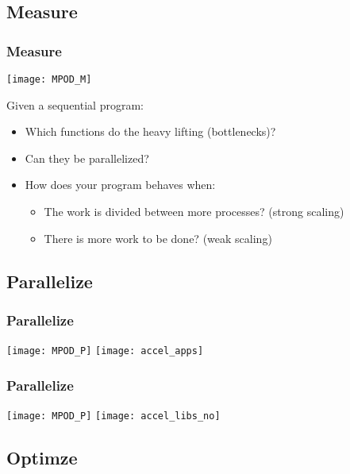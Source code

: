 \documentclass[10pt, compress]{beamer}
\begin{document}
\subsection{Measure}

\begin{frame}
    \frametitle{Measure}
    \begin{center}
    \texttt{[image: MPOD\_M]}
    \end{center}
    \vfill

    \pause
    Given a \alert{sequential program}:
    \begin{itemize}
        \item Which functions do the \alert{heavy lifting} (\alert{bottlenecks})?
            \pause
        \item Can they be \alert{parallelized}?
            \pause
        \item How does your program behaves when:
            \begin{itemize}
                \item The work is divided between more processes? (\alert{strong scaling})
                    \pause
                \item There is more work to be done? (\alert{weak scaling})
            \end{itemize}
    \end{itemize}
\end{frame}

\subsection{Parallelize}

\begin{frame}
    \frametitle{Parallelize}
    \begin{center}
    \texttt{[image: MPOD\_P]}
    \vfill
        \pause
    \texttt{[image: accel\_apps]}
    \end{center}
\end{frame}

\begin{frame}
    \frametitle{Parallelize}
    \begin{center}
    \texttt{[image: MPOD\_P]}
    \vfill
    \texttt{[image: accel\_libs\_no]}
    \end{center}
\end{frame}

\subsection{Optimze}
\end{document}
